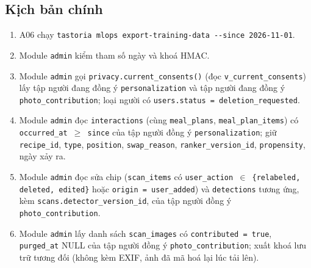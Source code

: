 \subsection{Kịch bản chính}
\begin{enumerate}
\item A06 chạy {\small\texttt{tastoria mlops export-\allowbreak{}training-\allowbreak{}data -\allowbreak{}-\allowbreak{}since 2026-\allowbreak{}11-\allowbreak{}01}}.
\item Module {\small\texttt{admin}} kiểm tham số ngày và khoá HMAC.
\item Module {\small\texttt{admin}} gọi {\small\texttt{privacy.\allowbreak{}current\_\allowbreak{}\allowbreak{}consents()}} (đọc {\small\texttt{v\_\allowbreak{}\allowbreak{}current\_\allowbreak{}\allowbreak{}consents}}) lấy tập người đang đồng ý {\small\texttt{personalization}} và tập người đang đồng ý {\small\texttt{photo\_\allowbreak{}\allowbreak{}contribution}}; loại người có {\small\texttt{users.\allowbreak{}status = deletion\_\allowbreak{}\allowbreak{}requested}}.
\item Module {\small\texttt{admin}} đọc {\small\texttt{interactions}} (cùng {\small\texttt{meal\_\allowbreak{}\allowbreak{}plans}}, {\small\texttt{meal\_\allowbreak{}\allowbreak{}plan\_\allowbreak{}\allowbreak{}items}}) có {\small\texttt{occurred\_\allowbreak{}\allowbreak{}at \ensuremath{\geq} since}} của tập người đồng ý {\small\texttt{personalization}}; giữ {\small\texttt{recipe\_\allowbreak{}\allowbreak{}id}}, {\small\texttt{type}}, {\small\texttt{position}}, {\small\texttt{swap\_\allowbreak{}\allowbreak{}reason}}, {\small\texttt{ranker\_\allowbreak{}\allowbreak{}version\_\allowbreak{}\allowbreak{}id}}, {\small\texttt{propensity}}, ngày xảy ra.
\item Module {\small\texttt{admin}} đọc sửa chip ({\small\texttt{scan\_\allowbreak{}\allowbreak{}items}} có {\small\texttt{user\_\allowbreak{}\allowbreak{}action \ensuremath{\in} \{relabeled, deleted, edited\}}} hoặc {\small\texttt{origin = user\_\allowbreak{}\allowbreak{}added}}) và {\small\texttt{detections}} tương ứng, kèm {\small\texttt{scans.\allowbreak{}detector\_\allowbreak{}\allowbreak{}version\_\allowbreak{}\allowbreak{}id}}, của tập người đồng ý {\small\texttt{photo\_\allowbreak{}\allowbreak{}contribution}}.
\item Module {\small\texttt{admin}} lấy danh sách {\small\texttt{scan\_\allowbreak{}\allowbreak{}images}} có {\small\texttt{contributed = true}}, {\small\texttt{purged\_\allowbreak{}\allowbreak{}at}} NULL của tập người đồng ý {\small\texttt{photo\_\allowbreak{}\allowbreak{}contribution}}; xuất khoá lưu trữ tương đối (không kèm EXIF, ảnh đã mã hoá lại lúc tải lên).

\end{enumerate}
